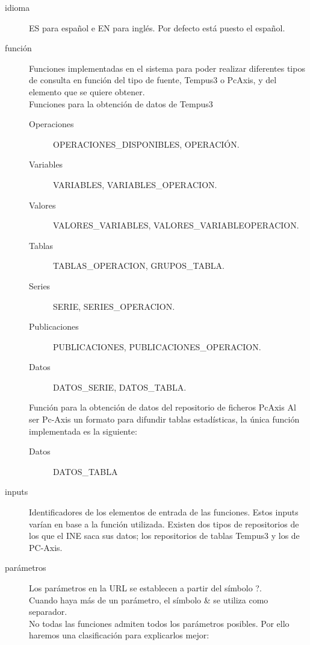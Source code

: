\begin{description}
	\item [idioma] ES para español e EN para inglés. Por defecto está puesto el español.\\
	\item [función] Funciones implementadas en el sistema para poder realizar diferentes tipos de consulta en función del tipo de fuente, Tempus3 o PcAxis, y del elemento que se quiere obtener.\\
    Funciones para la obtención de datos de Tempus3
         \begin{description}
         \item [Operaciones] OPERACIONES\_DISPONIBLES, OPERACIÓN.
         \item [Variables] VARIABLES, VARIABLES\_OPERACION.
         \item [Valores] VALORES\_VARIABLES, VALORES\_VARIABLEOPERACION.
         \item [Tablas] TABLAS\_OPERACION, GRUPOS\_TABLA.
         \item [Series] SERIE, SERIES\_OPERACION.
         \item [Publicaciones] PUBLICACIONES, PUBLICACIONES\_OPERACION.
         \item [Datos] DATOS\_SERIE, DATOS\_TABLA.
         \end{description}
    Función para la obtención de datos del repositorio de ficheros PcAxis Al ser Pc-Axis un formato para difundir tablas estadísticas, la única función implementada es la siguiente:
         \begin{description}
         \item [Datos] DATOS\_TABLA
         \end{description}
    \item [inputs] Identificadores de los elementos de entrada de las funciones. Estos inputs varían en base a la función utilizada.
    Existen dos tipos de repositorios de los que el INE saca sus datos; los repositorios de tablas Tempus3 y los de PC-Axis.
    \item [parámetros] Los parámetros en la URL se establecen a partir del símbolo ?.\\
    Cuando haya más de un parámetro, el símbolo & se utiliza como separador.\\
    No todas las funciones admiten todos los parámetros posibles. Por ello haremos una clasificación para explicarlos mejor:  

\end{description}
